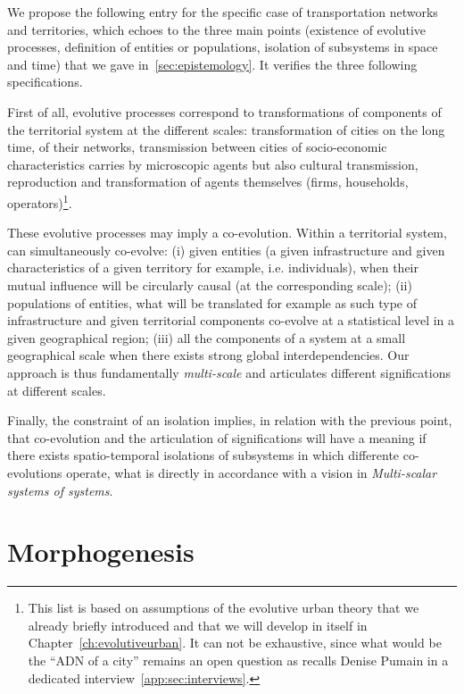 \documentclass[letterpaper]{article}
\begin{document}
We propose the following entry for the specific case of transportation networks and territories, which echoes to the three main points (existence of evolutive processes, definition of entities or populations, isolation of subsystems in space and time) that we gave in~\ref{sec:epistemology}. It verifies the three following specifications.


First of all, evolutive processes correspond to transformations of components of the territorial system at the different scales: transformation of cities on the long time, of their networks, transmission between cities of socio-economic characteristics carries by microscopic agents but also cultural transmission, reproduction and transformation of agents themselves (firms, households, operators)\footnote{This list is based on assumptions of the evolutive urban theory that we already briefly introduced and that we will develop in itself in Chapter~\ref{ch:evolutiveurban}. It can not be exhaustive, since what would be the ``ADN of a city'' remains an open question as recalls Denise Pumain in a dedicated interview~\ref{app:sec:interviews}.}.

These evolutive processes may imply a co-evolution. Within a territorial system, can simultaneously co-evolve: (i) given entities (a given infrastructure and given characteristics of a given territory for example, i.e. individuals), when their mutual influence will be circularly causal (at the corresponding scale); (ii) populations of entities, what will be translated for example as such type of infrastructure and given territorial components co-evolve at a statistical level in a given geographical region; (iii) all the components of a system at a small geographical scale when there exists strong global interdependencies. Our approach is thus fundamentally \emph{multi-scale} and articulates different significations at different scales.

Finally, the constraint of an isolation implies, in relation with the previous point, that co-evolution and the articulation of significations will have a meaning if there exists spatio-temporal isolations of subsystems in which differente co-evolutions operate, what is directly in accordance with a vision in \emph{Multi-scalar systems of systems}.












\section{Morphogenesis}
\end{document}
